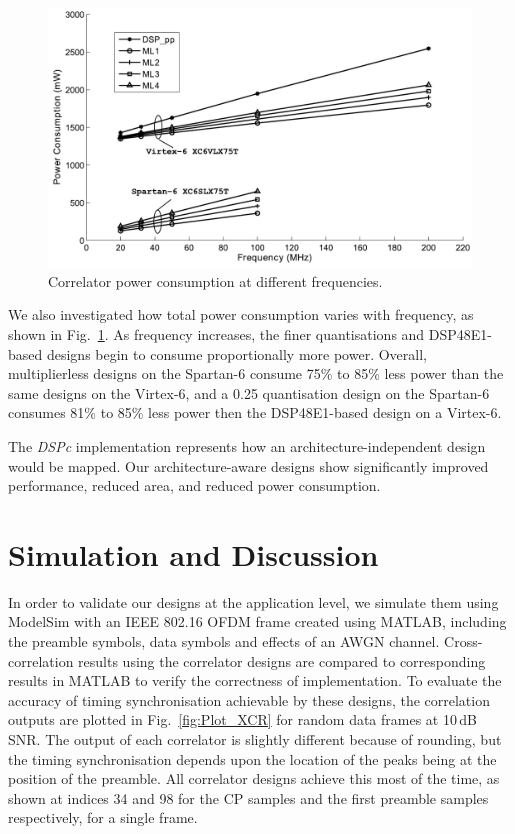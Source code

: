 \begin{figure}
	\centerline{\includegraphics [width=0.9\columnwidth] {figures/Plot_PWR.pdf} }
	\caption{Correlator power consumption at different frequencies.}
	\label{fig:Plot_PWR}
\end{figure}

We also investigated how total power consumption varies with frequency, as shown in Fig.~\ref{fig:Plot_PWR}.
As frequency increases, the finer quantisations and DSP48E1-based designs begin to consume proportionally more power.
Overall, multiplierless designs on the Spartan-6 consume 75\% to 85\% less power than the same designs on the Virtex-6, and a 0.25 quantisation design on the Spartan-6 consumes 81\% to 85\% less power then the DSP48E1-based design on a Virtex-6.

The \emph{DSPc} implementation represents how an architecture-independent design would be mapped. Our architecture-aware designs show significantly improved performance, reduced area, and reduced power consumption.

\section{Simulation and Discussion}
In order to validate our designs at the application level, we simulate them using ModelSim with an IEEE 802.16 OFDM frame created using MATLAB, including the preamble symbols, data symbols and effects of an AWGN channel.
Cross-correlation results using the correlator designs are compared to corresponding results in MATLAB to verify the correctness of implementation.
To evaluate the accuracy of timing synchronisation achievable by these designs, the correlation outputs are plotted in Fig.~\ref{fig:Plot_XCR} for random data frames at 10\,dB SNR.
The output of each correlator is slightly different because of rounding, but the timing synchronisation depends upon the location of the peaks being at the  position of the preamble.
All correlator designs achieve this most of the time, as shown at indices 34 and 98 for the CP samples and the first preamble samples respectively, for a single frame.

